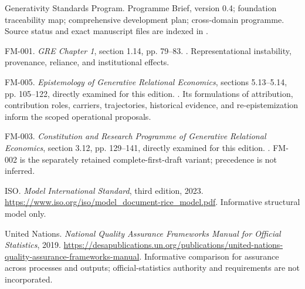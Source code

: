 \documentclass[11pt,a4paper]{article}
\begin{document}
\GSPbibliography
\begin{enumerate}[label={[\arabic*]}]
\item Generativity Standards Program. Programme Brief, version 0.4; foundation traceability map; comprehensive development plan; cross-domain programme. Source status and exact manuscript files are indexed in .
\item FM-001. \emph{GRE Chapter 1}, section 1.14, pp. 79--83. . Representational instability, provenance, reliance, and institutional effects.
\item FM-005. \emph{Epistemology of Generative Relational Economics}, sections 5.13--5.14, pp. 105--122, directly examined for this edition. . Its formulations of attribution, contribution roles, carriers, trajectories, historical evidence, and re-epistemization inform the scoped operational proposals.
\item FM-003. \emph{Constitution and Research Programme of Generative Relational Economics}, section 3.12, pp. 129--141, directly examined for this edition. . FM-002 is the separately retained complete-first-draft variant; precedence is not inferred.
\item ISO. \emph{Model International Standard}, third edition, 2023. \url{https://www.iso.org/iso/model_document-rice_model.pdf}. Informative structural model only.
\item United Nations. \emph{National Quality Assurance Frameworks Manual for Official Statistics}, 2019. \url{https://desapublications.un.org/publications/united-nations-quality-assurance-frameworks-manual}. Informative comparison for assurance across processes and outputs; official-statistics authority and requirements are not incorporated.
\end{enumerate}
\end{document}
